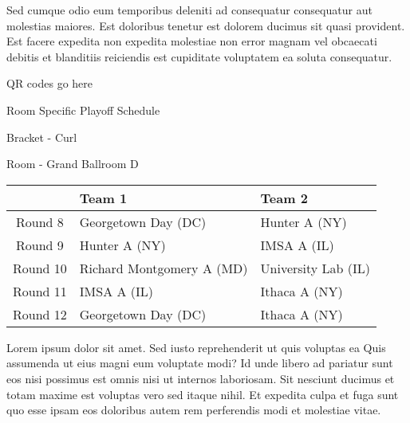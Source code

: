 \documentclass{article}%
\begin{document}
\newline%
Sed cumque odio eum temporibus deleniti ad consequatur consequatur aut molestias maiores. Est doloribus tenetur est dolorem ducimus sit quasi provident. Est facere expedita non expedita molestiae non error magnam vel obcaecati debitis et blanditiis reiciendis est cupiditate voluptatem ea soluta consequatur.%
\vspace*{140pt}%
\begin{center}%
\begin{Huge}%
QR codes go here%
\end{Huge}%
\end{center}%
\newpage%
\begin{center}%
\begin{Huge}%
Room Specific Playoff Schedule%
\end{Huge}%
\vspace*{8pt}%
\linebreak%
\begin{Large}%
Bracket {-} Curl%
\end{Large}%
\vspace*{8pt}%
\linebreak%
\vspace*{8pt}%
\begin{Large}%
Room {-} Grand Ballroom D%
\end{Large}%
\end{center}%
%
\begin{tabularx}{\textwidth}{|c|Y|Y|}%
\hline%
&Team 1&Team 2\\%
\hline%
Round 8&Georgetown Day (DC)&Hunter A (NY)\\%
Round 9&Hunter A (NY)&IMSA A (IL)\\%
Round 10&Richard Montgomery A (MD)&University Lab (IL)\\%
Round 11&IMSA A (IL)&Ithaca A (NY)\\%
Round 12&Georgetown Day (DC)&Ithaca A (NY)\\%
\hline%
\end{tabularx}%
\vspace*{8pt}%
\newline%
Lorem ipsum dolor sit amet. Sed iusto reprehenderit ut quis voluptas ea Quis assumenda ut eius magni eum voluptate modi? Id unde libero ad pariatur sunt eos nisi possimus est omnis nisi ut internos laboriosam. Sit nesciunt ducimus et totam maxime est voluptas vero sed itaque nihil. Et expedita culpa et fuga sunt quo esse ipsam eos doloribus autem rem perferendis modi et molestiae vitae.\newline%
\end{document}
